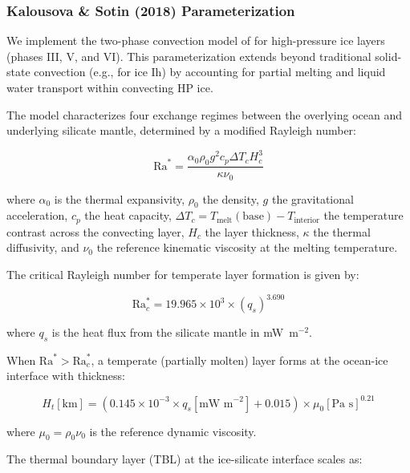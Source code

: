 \subsubsection{Kalousova \& Sotin (2018) Parameterization}

We implement the two-phase convection model of \citet{kalousova2018melting} for high-pressure ice layers (phases III, V, and VI). This parameterization extends beyond traditional solid-state convection (e.g., \citealt{deschamps2001thermal} for ice Ih) by accounting for partial melting and liquid water transport within convecting HP ice.

The model characterizes four exchange regimes between the overlying ocean and underlying silicate mantle, determined by a modified Rayleigh number:

\begin{equation}
\text{Ra}^* = \frac{\alpha_0 \rho_0 g^2 c_p \Delta T_c H_c^3}{\kappa \nu_0}
\label{eq:rastar}
\end{equation}

\noindent where $\alpha_0$ is the thermal expansivity, $\rho_0$ the density, $g$ the gravitational acceleration, $c_p$ the heat capacity, $\Delta T_c = T_{\text{melt}}(\text{base}) - T_{\text{interior}}$ the temperature contrast across the convecting layer, $H_c$ the layer thickness, $\kappa$ the thermal diffusivity, and $\nu_0$ the reference kinematic viscosity at the melting temperature.

The critical Rayleigh number for temperate layer formation is given by:

\begin{equation}
\text{Ra}^*_c = 19.965 \times 10^3 \times (q_s)^{3.690}
\label{eq:racrit}
\end{equation}

\noindent where $q_s$ is the heat flux from the silicate mantle in mW~m$^{-2}$.

When $\text{Ra}^* > \text{Ra}^*_c$, a temperate (partially molten) layer forms at the ocean-ice interface with thickness:

\begin{equation}
H_t[\text{km}] = (0.145 \times 10^{-3} \times q_s[\text{mW m}^{-2}] + 0.015) \times \mu_0[\text{Pa s}]^{0.21}
\label{eq:ht}
\end{equation}

\noindent where $\mu_0 = \rho_0 \nu_0$ is the reference dynamic viscosity.

The thermal boundary layer (TBL) at the ice-silicate interface scales as:

